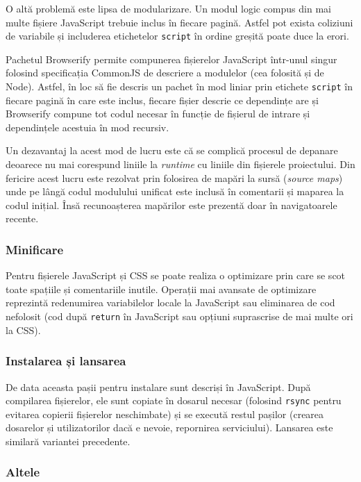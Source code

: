 \documentclass[a4wide,12pt]{report}
\newcommand{\eng}[1]{\emph{#1}} %
\newcommand{\cod}[1]{\texttt{#1}}
\begin{document}
O altă problemă este lipsa de modularizare. Un modul logic compus din mai multe
fișiere JavaScript trebuie inclus în fiecare pagină. Astfel pot exista coliziuni
de variabile și includerea etichetelor \cod{script} în ordine greșită poate duce
la erori.

Pachetul Browserify permite compunerea fișierelor JavaScript într-unul singur
folosind specificația CommonJS de descriere a modulelor (cea folosită și de
Node). Astfel, în loc să fie descris un pachet în mod liniar prin etichete
\cod{script} în fiecare pagină în care este inclus, fiecare fișier descrie ce
dependințe are și Browserify compune tot codul necesar în funcție de fișierul de
intrare și dependințele acestuia în mod recursiv.

Un dezavantaj la acest mod de lucru este că se complică procesul de depanare
deoarece nu mai corespund liniile la \eng{runtime} cu liniile din fișierele
proiectului. Din fericire acest lucru este rezolvat prin folosirea de mapări la
sursă (\eng{source maps}) unde pe lângă codul modulului unificat este inclusă în
comentarii și maparea la codul inițial. Însă recunoașterea mapărilor este
prezentă doar în navigatoarele recente.

\subsubsection{Minificare}

Pentru fișierele JavaScript și CSS se poate realiza o optimizare prin care se
scot toate spațiile și comentariile inutile. Operații mai avansate de optimizare
reprezintă redenumirea variabilelor locale la JavaScript sau eliminarea de cod
nefolosit (cod după \cod{return} în JavaScript sau opțiuni suprascrise de mai
multe ori la CSS).

\subsubsection{Instalarea și lansarea}

De data aceasta pașii pentru instalare sunt descriși în JavaScript. După
compilarea fișierelor, ele sunt copiate în dosarul necesar (folosind \cod{rsync}
pentru evitarea copierii fișierelor neschimbate) și se execută restul pașilor
(crearea dosarelor și utilizatorilor dacă e nevoie, repornirea serviciului).
Lansarea este similară variantei precedente.

\subsubsection{Altele}
\end{document}
